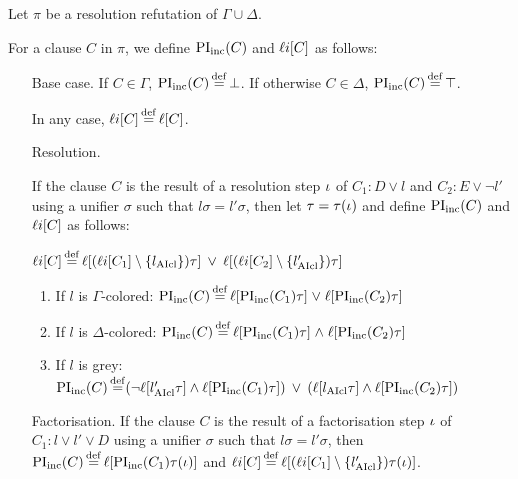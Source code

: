 \documentclass[,%
	draft=false,%
	numbers=noendperiod
	11pt,
	a4paper,
	oneside,%
	openany,
]{memoir}
\begin{document}
\begin{defi}
	Let $\pi$ be a resolution refutation of $\Gamma \cup \Delta$.

	For a clause $C$ in $\pi$, 
	we define $\operatorname{PI}_{\operatorname{inc}}(C)$ and $\mathop{\ell\text{}i}[C]$ as follows:
	~

	\begin{itemize}
		\item[Base case.]
			If $C \in \Gamma$, $\operatorname{PI}_{\operatorname{inc}}(C) \operatorname{\stackrel{\mathrm{def}}{=}} \bot$.
			If otherwise $C \in \Delta$, $\operatorname{PI}_{\operatorname{inc}}(C) \operatorname{\stackrel{\mathrm{def}}{=}} \top$.

			In any case, $\mathop{\ell\text{}i}[C] \operatorname{\stackrel{\mathrm{def}}{=}} \ell[C]$.
		\item[Resolution.]

			If the clause $C$ is the result of a resolution step $\iota$ of $C_1: D \lor l$ and $C_2: E \lor \lnot l'$ using a unifier $\sigma$ such that $l\sigma =  l'\sigma$, then let $\tau = \tau(\iota)$ and define $\operatorname{PI}_{\operatorname{inc}}(C)$ and $\mathop{\ell\text{}i}[C]$ as follows:

			$\mathop{\ell\text{}i}[C] \operatorname{\stackrel{\mathrm{def}}{=}} \ell[(\mathop{\ell\text{}i}[C_1] \setminus \{l_{\operatorname{AIcl}}\})\tau] \;\,{\lor}\;\, \ell[(\mathop{\ell\text{}i}[C_2]\setminus \{l_{\operatorname{AIcl}}'\})\tau] $

			\begin{enumerate}

				\item If $l$ is $\Gamma$-colored:
					$\operatorname{PI}_{\operatorname{inc}}(C) \operatorname{\stackrel{\mathrm{def}}{=}} \ell[\operatorname{PI}_{\operatorname{inc}}(C_1)\tau]\;{\lor}\; \ell[\operatorname{PI}_{\operatorname{inc}}(C_2)\tau] $

				\item If $l$ is $\Delta$-colored:
					$\operatorname{PI}_{\operatorname{inc}}(C) \operatorname{\stackrel{\mathrm{def}}{=}} \ell[\operatorname{PI}_{\operatorname{inc}}(C_1)\tau]\;{\land}\; \ell[\operatorname{PI}_{\operatorname{inc}}(C_2)\tau] $

				\item If $l$ is grey:
					$\operatorname{PI}_{\operatorname{inc}}(C) \operatorname{\stackrel{\mathrm{def}}{=}}
					(\lnot {\ell[l'\ensuremath{_{\operatorname{AIcl}}}\tau]} \land \ell[\operatorname{PI}_{\operatorname{inc}}(C_1)\tau]) \;\,{\lor}\;\,
					(\ell[l_{\operatorname{AIcl}}\tau]\land \ell[\operatorname{PI}_{\operatorname{inc}}(C_2)\tau ])
					$

			\end{enumerate}

		\item[Factorisation.]
			If the clause $C$ is the result of a factorisation step $\iota$ of $C_1: l \lor l' \lor D$ using a unifier $\sigma$ such that $l\sigma = l'\sigma$, then $\operatorname{PI}_{\operatorname{inc}}(C) \operatorname{\stackrel{\mathrm{def}}{=}} \ell[\operatorname{PI}_{\operatorname{inc}}(C_1)\tau(\iota)]$ and $\lifiboth{C} \defeq \lifboth{ (\lifiboth{C_1} \setminus\nolinebreak \{l'\cl\})\tau(\inference)}$.
			\qedhere

	\end{itemize}

\end{defi}
\end{document}
